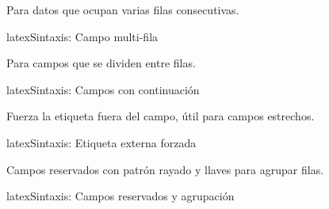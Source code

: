 Para datos que ocupan varias filas consecutivas.

\begin{codigosimple}{latex}{Sintaxis: Campo multi-fila}
\end{codigosimple}

\begin{protocolframe}[16]
\end{protocolframe}

\vspace{1em}

Para campos que se dividen entre filas.

\begin{codigosimple}{latex}{Sintaxis: Campos con continuación}
\end{codigosimple}

\begin{protocolframe}[8]
\end{protocolframe}

\vspace{1em}

Fuerza la etiqueta fuera del campo, útil para campos estrechos.

\begin{codigosimple}{latex}{Sintaxis: Etiqueta externa forzada}
\end{codigosimple}

\begin{protocolframe}[16]
\end{protocolframe}

\vspace{1em}

Campos reservados con patrón rayado y llaves para agrupar filas.

\begin{codigosimple}{latex}{Sintaxis: Campos reservados y agrupación}
\end{codigosimple}


